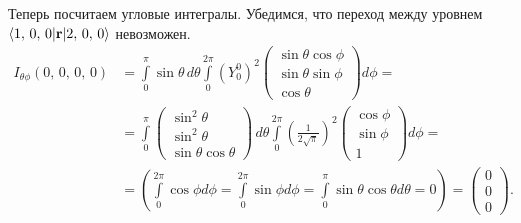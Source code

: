 Теперь посчитаем угловые интегралы. Убедимся, что переход между уровнем
$\langle1,\,0,\,0\rvert\mathbf{r}\lvert2,\,0,\,0\rangle$ невозможен.
\begin{align*}
  I_{\theta\phi}(0,\,0,\,0,\,0) &= \int\limits_{0}^{\pi}\sin\theta\,d\theta\int\limits_{0}^{2\pi}(Y^0_0)^2 \begin{pmatrix} \sin\theta\cos\phi \\ \sin\theta\sin\phi \\ \cos\theta \end{pmatrix} d\phi = \\& = \int\limits_{0}^{\pi} \begin{pmatrix} \sin^2 \theta \\ \sin^2 \theta \\ \sin\theta\cos\theta \end{pmatrix} \, d\theta \int\limits_{0}^{2\pi} \left(\frac{1}{2\sqrt{\pi}}\right)^2 \begin{pmatrix} \cos\phi \\ \sin\phi \\ 1 \end{pmatrix} d\phi = \\& = \left( \int\limits_{0}^{2\pi} \cos\phi d\phi =
  \int\limits_{0}^{2\pi} \sin\phi d\phi = \int\limits_{0}^{\pi} \sin\theta
  \cos\theta d\theta = 0 \right) = \begin{pmatrix} 0 \\ 0 \\ 0
  \end{pmatrix}.
\end{align*}

